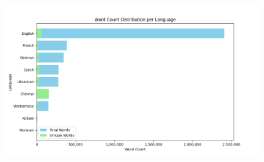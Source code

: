 \documentclass[aspectratio=169]{beamer}
\begin{document}
\begin{frame}[fragile]
\begin{figure}
\begin{overprint}
             \includegraphics[height=6.6cm]{images/mtacr-2024-april-all.png} 
        \end{overprint}
        
    \end{figure}
\end{frame}




\end{document}
